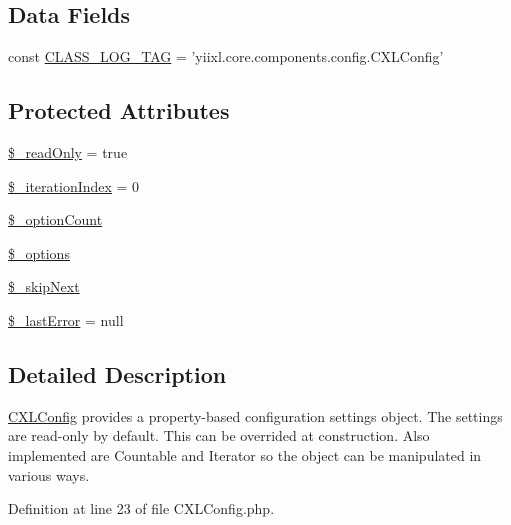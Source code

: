 \subsection*{Data Fields}
\begin{DoxyCompactItemize}
\item 
const \hyperlink{classCXLConfig_aa607ab5e557e6ebb60b85c5a20ad067f}{CLASS\_\-LOG\_\-TAG} = 'yiixl.core.components.config.CXLConfig'
\end{DoxyCompactItemize}
\subsection*{Protected Attributes}
\begin{DoxyCompactItemize}
\item 
\hyperlink{classCXLConfig_aa2562d06c3ceeb66f5dd4410d11739ad}{\$\_\-readOnly} = true
\item 
\hyperlink{classCXLConfig_abe40a042fbf2d8b1bddb7bf3cb4d9622}{\$\_\-iterationIndex} = 0
\item 
\hyperlink{classCXLConfig_acbd6cae35f3bb2f2daac19326e69c6f3}{\$\_\-optionCount}
\item 
\hyperlink{classCXLConfig_a1bebdc689c84eee59ad24c77e5531762}{\$\_\-options}
\item 
\hyperlink{classCXLConfig_afea2c33a564049f3607b21952dc4e6bf}{\$\_\-skipNext}
\item 
\hyperlink{classCXLConfig_a532318e4d8a2c9612f5abd5f6317dcfd}{\$\_\-lastError} = null
\end{DoxyCompactItemize}


\subsection{Detailed Description}
\hyperlink{classCXLConfig}{CXLConfig} provides a property-\/based configuration settings object. The settings are read-\/only by default. This can be overrided at construction. Also implemented are Countable and Iterator so the object can be manipulated in various ways. 

Definition at line 23 of file CXLConfig.php.



